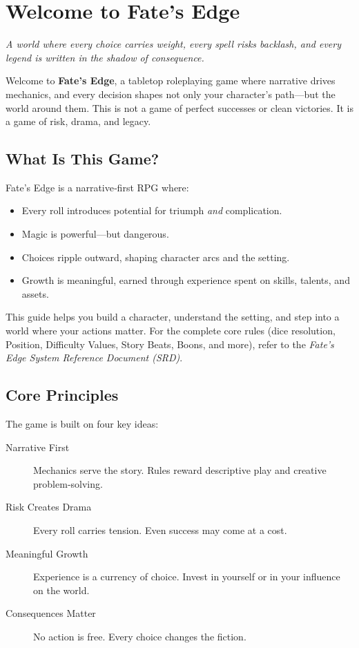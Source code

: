 \chapter{Welcome to Fate's Edge}
\label{ch:intro}

\emph{A world where every choice carries weight, every spell risks backlash, and every legend is written in the shadow of consequence.}

Welcome to \textbf{Fate's Edge}, a tabletop roleplaying game where narrative drives mechanics, and every decision shapes not only your character’s path—but the world around them. This is not a game of perfect successes or clean victories. It is a game of risk, drama, and legacy.

\section*{What Is This Game?}

Fate's Edge is a narrative‑first RPG where:
\begin{itemize}
\item Every roll introduces potential for triumph \emph{and} complication.
\item Magic is powerful—but dangerous.
\item Choices ripple outward, shaping character arcs and the setting.
\item Growth is meaningful, earned through experience spent on skills, talents, and assets.
\end{itemize}

This guide helps you build a character, understand the setting, and step into a world where your actions matter. For the complete core rules (dice resolution, Position, Difficulty Values, Story Beats, Boons, and more), refer to the \textit{Fate's Edge System Reference Document (SRD)}.

\section*{Core Principles}

The game is built on four key ideas:

\begin{description}
\item[Narrative First] Mechanics serve the story. Rules reward descriptive play and creative problem‑solving.
\item[Risk Creates Drama] Every roll carries tension. Even success may come at a cost.
\item[Meaningful Growth] Experience is a currency of choice. Invest in yourself or in your influence on the world.
\item[Consequences Matter] No action is free. Every choice changes the fiction.
\end{description}

